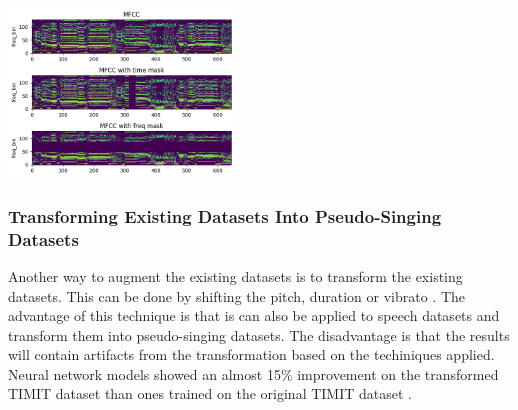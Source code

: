 \documentclass[letterpaper, 12pt]{article}
\begin{document}
\begin{multicols*}{2}
{
    \centering
    \includegraphics[width=0.45\textwidth]{assets/specaugment.png}
}

\subsubsection{Transforming Existing Datasets Into Pseudo-Singing Datasets} \label{sec:pseudoSinging}
Another way to augment the existing datasets is to transform the existing datasets. This can be
done by shifting the pitch, duration or vibrato \citep{SongifiedSpeech}. The advantage of this
technique is that is can also be applied to speech datasets and transform them into pseudo-singing
datasets. The disadvantage is that the results will contain artifacts from the transformation based
on the techiniques applied. Neural network models showed an almost 15\% improvement on the
transformed TIMIT dataset than ones trained on the original TIMIT dataset \citep{SongifiedSpeech}.


\end{multicols*}
\end{document}
